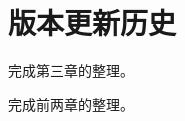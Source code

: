 \chapter*{版本更新历史}


\begin{change}
  \item 完成第三章的整理。
\end{change}


\begin{change}
  \item 完成前两章的整理。
\end{change}